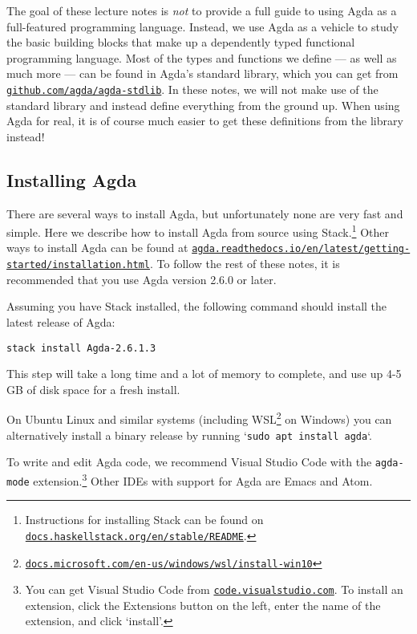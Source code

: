\documentclass[a4paper,UKenglish]{tufte-handout}
\newcommand{\hrefu}[2]{\href{#1}{\nolinkurl{#2}}}
\theoremstyle{definition}
\begin{document}
The goal of these lecture notes is \emph{not} to provide a full guide to using
Agda as a full-featured programming language. Instead, we use Agda as a vehicle
to study the basic building blocks that make up a dependently typed functional
programming language. Most of the types and functions we define --- as well as
much more --- can be found in Agda's standard library, which you can get from
\hrefu{https://github.com/agda/agda-stdlib}{github.com/agda/agda-stdlib}. In
these notes, we will not make use of the standard library and instead define
everything from the ground up. When using Agda for real, it is of course
much easier to get these definitions from the library instead!


\subsection{Installing Agda}

There are several ways to install Agda, but unfortunately none are
very fast and simple. Here we describe how to install Agda from source
using Stack.\footnote{Instructions for installing Stack can be found
on \hrefu{https://docs.haskellstack.org/en/stable/README/}{docs.haskellstack.org/en/stable/README}.} Other ways
to install Agda can be found at
\hrefu{https://agda.readthedocs.io/en/latest/getting-started/installation.html}{agda.readthedocs.io/en/latest/getting-started/installation.html}.
To follow the rest of these notes, it is recommended that you use
Agda version 2.6.0 or later.

Assuming you have Stack installed, the following command should install the
latest release of Agda:
\begin{verbatim}
stack install Agda-2.6.1.3
\end{verbatim}
This step will take a long time and a lot of memory to complete, and
use up 4-5 GB of disk space for a fresh install.

On Ubuntu Linux and similar systems (including
WSL\footnote{\hrefu{https://docs.microsoft.com/en-us/windows/wsl/install-win10}{docs.microsoft.com/en-us/windows/wsl/install-win10}}
on Windows) you can alternatively install a binary release by running
`\texttt{sudo apt install agda}`.

To write and edit Agda code, we recommend Visual Studio Code with the
\texttt{agda-mode} extension.\footnote{You can get Visual Studio Code
from \hrefu{https://code.visualstudio.com/}{code.visualstudio.com}. To install an extension,
click the Extensions button on the left, enter the name of the
extension, and click `install'.} Other IDEs with support for Agda are
Emacs and Atom.
\end{document}

